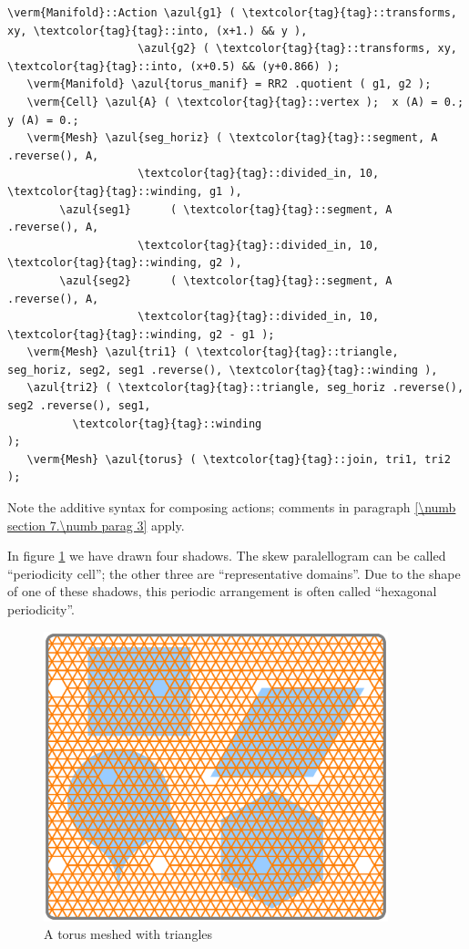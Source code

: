 \begin{Verbatim}[commandchars=\\\{\},formatcom=\small\tt,frame=single,
   label=parag-\ref{\numb section 7.\numb parag 9}.cpp,rulecolor=\color{coment},
   baselinestretch=0.94,framesep=2mm                                            ]
   \verm{Manifold}::Action \azul{g1} ( \textcolor{tag}{tag}::transforms, xy, \textcolor{tag}{tag}::into, (x+1.) && y ),
                    \azul{g2} ( \textcolor{tag}{tag}::transforms, xy, \textcolor{tag}{tag}::into, (x+0.5) && (y+0.866) );
   \verm{Manifold} \azul{torus_manif} = RR2 .quotient ( g1, g2 );
   \verm{Cell} \azul{A} ( \textcolor{tag}{tag}::vertex );  x (A) = 0.;  y (A) = 0.;
   \verm{Mesh} \azul{seg_horiz} ( \textcolor{tag}{tag}::segment, A .reverse(), A,
                    \textcolor{tag}{tag}::divided_in, 10, \textcolor{tag}{tag}::winding, g1 ),
        \azul{seg1}      ( \textcolor{tag}{tag}::segment, A .reverse(), A,
                    \textcolor{tag}{tag}::divided_in, 10, \textcolor{tag}{tag}::winding, g2 ),
        \azul{seg2}      ( \textcolor{tag}{tag}::segment, A .reverse(), A,
                    \textcolor{tag}{tag}::divided_in, 10, \textcolor{tag}{tag}::winding, g2 - g1 );
   \verm{Mesh} \azul{tri1} ( \textcolor{tag}{tag}::triangle, seg_horiz, seg2, seg1 .reverse(), \textcolor{tag}{tag}::winding ),
   \azul{tri2} ( \textcolor{tag}{tag}::triangle, seg_horiz .reverse(), seg2 .reverse(), seg1,
          \textcolor{tag}{tag}::winding                                             );
   \verm{Mesh} \azul{torus} ( \textcolor{tag}{tag}::join, tri1, tri2 );
\end{Verbatim}

Note the additive syntax for composing actions; comments in paragraph
\ref{\numb section 7.\numb parag 3} apply.

In figure \ref{\numb section 7.\numb fig 6} we have drawn four shadows.
The skew paralellogram can be called ``periodicity cell'';
the other three are ``representative domains''.
Due to the shape of one of these shadows, this periodic arrangement is often called
``hexagonal periodicity''.

\begin{figure}[ht] \centering
  \includegraphics[width=100mm]{flat-torus-5.eps}
  \caption{A torus meshed with triangles}
  \label{\numb section 7.\numb fig 6}
\end{figure}


